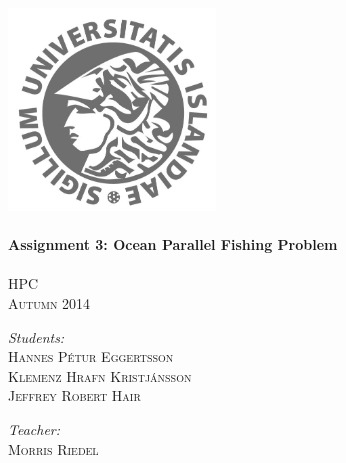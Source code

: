 \documentclass{article}
\begin{document}
\begin{titlepage}
\begin{center}

\textsc{}\\[2cm] 

\includegraphics[width=5.5cm]{Haskoli_Islands_rett.jpg}\\[0.5cm]

\HRule \\[0.6cm]
{ \huge \bfseries Assignment 3: Ocean Parallel Fishing Problem}\\[0.2cm]
\HRule \\[0.4cm]

\textsc{\normalsize HPC} \\
\textsc{Autumn 2014} \\[1.5cm]

\begin{minipage}{0.45\textwidth}
\begin{flushleft} \large
\textit{Students:}\\
\textsc{Hannes Pétur Eggertsson} \\
\textsc{Klemenz Hrafn Kristjánsson}\\
\textsc{Jeffrey Robert Hair}
\end{flushleft}
\end{minipage}
\begin{minipage}{0.45\textwidth}
\begin{flushright} \large
\textit{Teacher:} \\
\textsc{Morris Riedel}\\
\textsc{ }\\
\textsc{ }\\
\end{flushright}
\end{minipage}

\end{center}
\end{titlepage}
\end{document}
